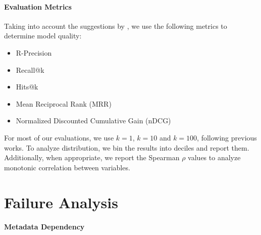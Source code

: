 \paragraph{Evaluation Metrics}

Taking into account the suggestions by \citet{xiaoxi-li-from-matching}, we use the following metrics to determine model quality:
\begin{itemize}
\item R-Precision
\item Recall@k
\item Hits@k
\item Mean Reciprocal Rank (MRR)
\item Normalized Discounted Cumulative Gain (nDCG)
\end{itemize}

For most of our evaluations, we use $k=1$, $k=10$ and $k=100$, following previous works. %
To analyze distribution, we bin the results into deciles and report them. Additionally, when appropriate, we report the Spearman $\rho$ values to analyze monotonic correlation between variables.


\section{Failure Analysis}



\paragraph{Metadata Dependency}


